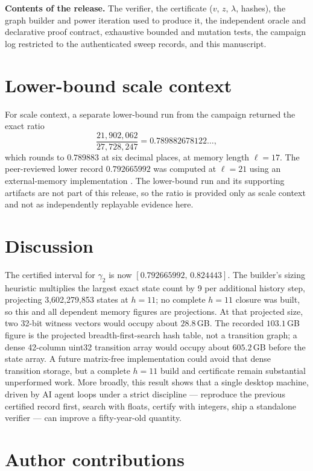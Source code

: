 \documentclass[11pt]{article}
\theoremstyle{plain}
\begin{document}
\textbf{Contents of the release.} The verifier, the certificate ($v$, $z$, $\lambda$, hashes), the graph builder and power iteration used to produce it, the independent oracle and declarative proof contract, exhaustive bounded and mutation tests, the campaign log restricted to the authenticated sweep records, and this manuscript.

\section{Lower-bound scale context}

For scale context, a separate lower-bound run from the campaign returned the exact ratio
\[
\frac{21{,}902{,}062}{27{,}728{,}247}=0.789882678122\ldots,
\]
which rounds to $0.789883$ at six decimal places, at memory length $\ell=17$. The peer-reviewed lower record $0.792665992$ was computed at $\ell=21$ using an external-memory implementation \cite{soiffer2025}. The lower-bound run and its supporting artifacts are not part of this release, so the ratio is provided only as scale context and not as independently replayable evidence here.

\section{Discussion}

The certified interval for $\gamma_2$ is now $[0.792665992,\, 0.824443]$. The builder's sizing heuristic multiplies the largest exact state count by 9 per additional history step, projecting 3{,}602{,}279{,}853 states at $h=11$; no complete $h=11$ closure was built, so this and all dependent memory figures are projections. At that projected size, two 32-bit witness vectors would occupy about $28.8$\,GB. The recorded $103.1$\,GB figure is the projected breadth-first-search hash table, not a transition graph; a dense 42-column uint32 transition array would occupy about $605.2$\,GB before the state array. A future matrix-free implementation could avoid that dense transition storage, but a complete $h=11$ build and certificate remain substantial unperformed work. More broadly, this result shows that a single desktop machine, driven by AI agent loops under a strict discipline --- reproduce the previous certified record first, search with floats, certify with integers, ship a standalone verifier --- can improve a fifty-year-old quantity.

\section{Author contributions}
\label{sec:contributions}
\end{document}
